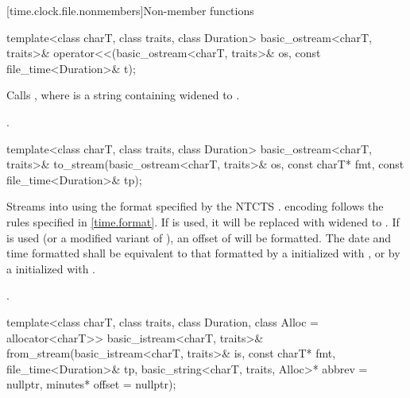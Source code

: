 [time.clock.file.nonmembers]{Non-member functions}

%
\begin{itemdecl}
template<class charT, class traits, class Duration>
  basic_ostream<charT, traits>&
    operator<<(basic_ostream<charT, traits>& os, const file_time<Duration>& t);
\end{itemdecl}

\begin{itemdescr}
\pnum
\effects Calls ,
where  is a string containing
 widened to .

\pnum
\returns {}.
\end{itemdescr}

%
\begin{itemdecl}
template<class charT, class traits, class Duration>
  basic_ostream<charT, traits>&
    to_stream(basic_ostream<charT, traits>& os, const charT* fmt, const file_time<Duration>& tp);
\end{itemdecl}

\begin{itemdescr}
\pnum
\effects
Streams  into  using
the format specified by the NTCTS .
 encoding follows the rules specified in \ref{time.format}.
If  is used, it will be replaced with  widened to .
If  is used (or a modified variant of ),
an offset of  will be formatted.
The date and time formatted shall be equivalent to
that formatted by a  initialized with
,
or by a  initialized with
.

\pnum
\returns {}.
\end{itemdescr}

%
\begin{itemdecl}
template<class charT, class traits, class Duration, class Alloc = allocator<charT>>
  basic_istream<charT, traits>&
    from_stream(basic_istream<charT, traits>& is, const charT* fmt,
                file_time<Duration>& tp, basic_string<charT, traits, Alloc>* abbrev = nullptr,
                minutes* offset = nullptr);
\end{itemdecl}


